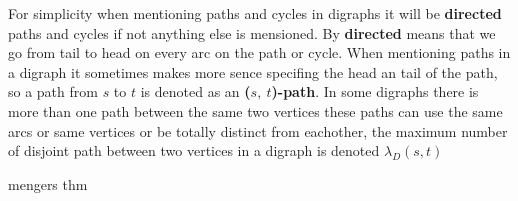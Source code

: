 For simplicity when mentioning paths and cycles in digraphs it will be \textbf{directed} paths and cycles if not anything else is mensioned. 
By \textbf{directed} means that we go from tail to head on every arc on the path or cycle.
When mentioning paths in a digraph it sometimes makes more sence specifing the head an tail of the path, so a path from $s$ to $t$ is denoted as an \textbf{($s,\ t$)-path}.
In some digraphs there is more than one path between the same two vertices these paths can use the same arcs or same vertices or be totally distinct from eachother, the maximum number of disjoint path between two vertices in a digraph is denoted $\lambda_D(s,t)$
 

\begin{thm}
    mengers thm
\end{thm}

